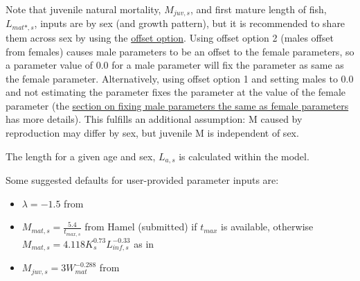Note that juvenile natural mortality, $M_{juv,s}$, and first mature length of fish, $L_{mat*,s}$, inputs are by sex (and growth pattern), but it is recommended to share them across sex by using the \hyperlink{offset}{offset option}. Using offset option 2 (males offset from females) causes male parameters to be an offset to the female parameters, so a parameter value of 0.0 for a male parameter will fix the parameter as same as the female parameter. Alternatively, using offset option 1 and setting males to 0.0 and not estimating the parameter fixes the parameter at the value of the female parameter (the \hyperlink{male-shortcut}{section on fixing male parameters the same as female parameters} has more details). This fulfills an additional assumption: M caused by reproduction may differ by sex, but juvenile M is independent of sex.

The length for a given age and sex, $L_{a,s}$ is calculated within the model.

Some suggested defaults for user-provided parameter inputs are:
\begin{itemize}
 \item $\lambda = -1.5$ from \citet{gulland1987natural}
 \item $M_{mat,s}=\frac{5.4}{t_{max,s}}$ from Hamel (submitted) if $t_{max}$ is available, otherwise $M_{mat,s} = 4.118K_{s}^{0.73}L_{inf,s}^{-0.33}$ as in \citet{then2015evaluating} 
 \item $M_{juv,s} = 3W_{mat}^{-0.288}$ from \citet{lorenzen1996relationship}
\end{itemize}

